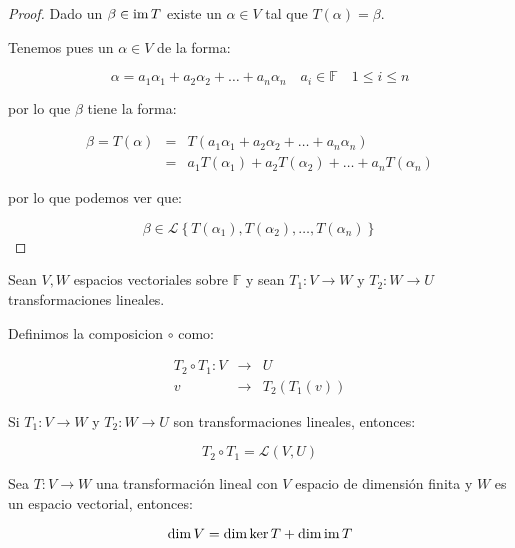 		\begin{proof}
			Dado un $\beta \in \operatorname{im}{T}$ existe un $\alpha \in V$ tal que $T(\alpha) = \beta$.

			Tenemos pues un $\alpha \in V$ de la forma:

			\begin{equation*}
				\alpha = a_1 \alpha_1 + a_2 \alpha_2 + \dots + a_n \alpha_n \quad a_i \in \mathbb{F} \quad 1 \leq i \leq n
			\end{equation*}

			por lo que $\beta$ tiene la forma:

			\begin{eqnarray*}
				\beta = T(\alpha) & = & T(a_1 \alpha_1 + a_2 \alpha_2 + \dots + a_n \alpha_n) \\
				& = & a_1 T(\alpha_1) + a_2 T(\alpha_2) + \dots + a_n T(\alpha_n)
			\end{eqnarray*}

			por lo que podemos ver que:

			\begin{equation*}
				\beta \in \mathcal{L} \left\{ T(\alpha_1), T(\alpha_2), \dots, T(\alpha_n) \right\}
			\end{equation*}
		\end{proof}

		\begin{definicion}
			Sean $V, W$ espacios vectoriales sobre $\mathbb{F}$ y sean $T_1 \colon V \to W$ y $T_2 \colon W \to U$ transformaciones lineales.

			Definimos la composicion $\circ$ como:

			\begin{eqnarray}
				T_2 \circ T_1 \colon V & \to & U \nonumber \\
				v & \to & T_2(T_1(v))
			\end{eqnarray}
		\end{definicion}

		\begin{proposicion}
			Si $T_1 \colon V \to W$ y $T_2 \colon W \to U$ son transformaciones lineales, entonces:

			\begin{equation}
				T_2 \circ T_1 = \mathcal{L}(V, U)
			\end{equation}
		\end{proposicion}

		\begin{teorema}
			Sea $T \colon V \to W$ una transformación lineal con $V$ espacio de dimensión finita y $W$ es un espacio vectorial, entonces:

			\begin{equation}
				\dim{V} = \dim{\ker{T}} + \dim{\operatorname{im}{T}}
			\end{equation}
		\end{teorema}

